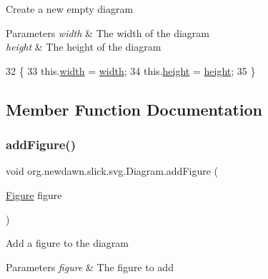 Create a new empty diagram


\begin{DoxyParams}{Parameters}
{\em width} & The width of the diagram \\
\hline
{\em height} & The height of the diagram \\
\hline
\end{DoxyParams}

\begin{DoxyCode}
32                                               \{
33         this.\mbox{\hyperlink{classorg_1_1newdawn_1_1slick_1_1svg_1_1_diagram_aa2e5e9291614fb66fef4f8d0672a9da6}{width}} = \mbox{\hyperlink{classorg_1_1newdawn_1_1slick_1_1svg_1_1_diagram_aa2e5e9291614fb66fef4f8d0672a9da6}{width}};
34         this.\mbox{\hyperlink{classorg_1_1newdawn_1_1slick_1_1svg_1_1_diagram_a5b6d7878e986b788521bb72fb0168518}{height}} = \mbox{\hyperlink{classorg_1_1newdawn_1_1slick_1_1svg_1_1_diagram_a5b6d7878e986b788521bb72fb0168518}{height}};
35     \}
\end{DoxyCode}


\subsection{Member Function Documentation}
\mbox{\label{classorg_1_1newdawn_1_1slick_1_1svg_1_1_diagram_a3236e5149ac3b950921c1c0fe27ad8ad}} 
\subsubsection{\texorpdfstring{add\+Figure()}{addFigure()}}
{\footnotesize\ttfamily void org.\+newdawn.\+slick.\+svg.\+Diagram.\+add\+Figure (\begin{DoxyParamCaption}\item[{\mbox{\hyperlink{classorg_1_1newdawn_1_1slick_1_1svg_1_1_figure}{Figure}}}]{figure }\end{DoxyParamCaption})\hspace{0.3cm}{\ttfamily [inline]}}

Add a figure to the diagram


\begin{DoxyParams}{Parameters}
{\em figure} & The figure to add \\
\hline
\end{DoxyParams}

